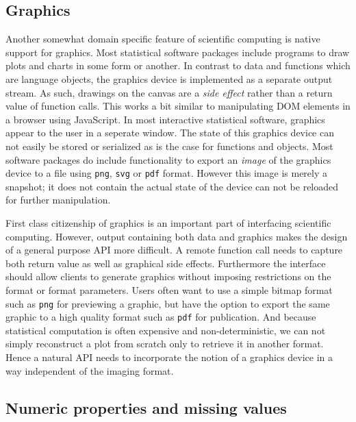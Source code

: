 \subsection{Graphics}

Another somewhat domain specific feature of scientific computing is native support for graphics. Most statistical software packages include programs to draw plots and charts in some form or another. In contrast to data and functions which are language objects, the graphics device is implemented as a separate output stream. As such, drawings on the canvas are a \emph{side effect} rather than a return value of function calls. This works a bit similar to manipulating DOM elements in a browser using JavaScript. In most interactive statistical software, graphics appear to the user in a seperate window. The state of this graphics device can not easily be stored or serialized as is the case for functions and objects. Most software packages do include functionality to export an \emph{image} of the graphics device to a file using \texttt{png}, \texttt{svg} or \texttt{pdf} format. However this image is merely a snapshot; it does not contain the actual state of the device can not be reloaded for further manipulation.

First class citizenship of graphics is an important part of interfacing scientific computing. However, output containing both data and graphics makes the design of a general purpose API more difficult. A remote function call needs to capture both return value as well as graphical side effects. Furthermore the interface should allow clients to generate graphics without imposing restrictions on the format or format parameters. Users often want to use a simple bitmap format such as \texttt{png} for previewing a graphic, but have the option to export the same graphic to a high quality format such as \texttt{pdf} for publication. And because statistical computation is often expensive and non-deterministic, we can not simply reconstruct a plot from scratch only to retrieve it in another format. Hence a natural API needs to incorporate the notion of a graphics device in a way independent of the imaging format. 

\subsection{Numeric properties and missing values}

